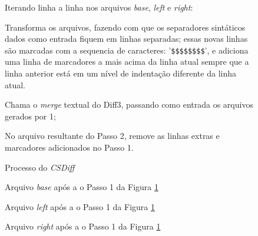 \begin{figure}[ht]
	\begin{center}
		\begin{compactenum}[(1)]
			\item Iterando linha a linha nos arquivos \emph{base}, \emph{left} e \emph{right}:
			\begin{compactenum}
				\item Transforma os arquivos, fazendo com que os separadores sintáticos
				dados como entrada fiquem em linhas separadas; essas novas linhas são marcadas com a sequencia de caracteres:
				'\verb|$$$$$$$$|', e adiciona uma linha de marcadores a mais acima da linha atual
				sempre que a linha anterior está em um nível de
				indentação diferente da linha atual.
			\end{compactenum}
			\item Chama o \emph{merge} textual do Diff3, passando como entrada os arquivos gerados por 1;
			\item No arquivo resultante do Passo 2, remove as linhas extras e marcadores adicionados no Passo 1.
		\end{compactenum}
	\end{center}
	\caption{Processo do \emph{CSDiff}}\label{csdiff_process_indentation}
\end{figure}


\begin{figure}[ht]
	\begin{center}
		
		\caption{Arquivo \emph{base} após a o Passo 1 da Figura
			\ref{csdiff_process_indentation}}\label{base_marcadores_indentacao}
	\end{center}
\end{figure}

\begin{figure}[ht]
	\begin{center}
		
		\caption{Arquivo \emph{left} após a o Passo 1 da Figura
			\ref{csdiff_process_indentation}}\label{left_marcadores_indentacao}
	\end{center}
\end{figure}

\begin{figure}[ht]
	\begin{center}
		
		\caption{Arquivo \emph{right} após a o Passo 1 da Figura
			\ref{csdiff_process_indentation}}\label{right_marcadores_indentacao}
	\end{center}
\end{figure}

